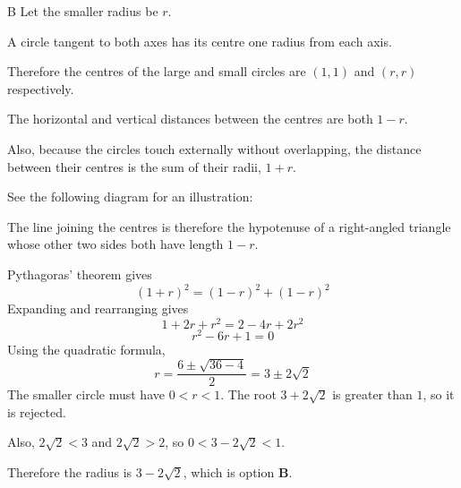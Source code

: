 \documentclass[11pt,a4paper]{article}
\begin{document}
\begin{enumerate}[label=\textbf{\arabic*.},leftmargin=*,itemsep=0pt,start=9]
\begin{djsSolution}{B}
Let the smaller radius be $r$. 

A circle tangent to both axes has its centre one radius from each axis. 

Therefore the centres of the large and small circles are $(1,1)$ and $(r,r)$ respectively.

The horizontal and vertical distances between the centres are both $1-r$. 

Also, because the circles touch externally without overlapping, the distance between their centres is the sum of their radii, $1+r$.

See the following diagram for an illustration:

\begin{djsSolutionFigure}
\end{djsSolutionFigure}

The line joining the centres is therefore the hypotenuse of a right-angled triangle whose other two sides both have length $1-r$. 

Pythagoras' theorem gives
\[
(1+r)^2=(1-r)^2+(1-r)^2
\]
Expanding and rearranging gives
\[
1+2r+r^2=2-4r+2r^2
\]
\[
r^2-6r+1=0
\]
Using the quadratic formula,
\[
r=\frac{6\pm\sqrt{36-4}}{2}=3\pm2\sqrt{2}
\]
The smaller circle must have $0<r<1$. The root $3+2\sqrt{2}$ is greater than $1$, so it is rejected. 

Also, $2\sqrt{2}<3$ and $2\sqrt{2}>2$, so $0<3-2\sqrt{2}<1$.

Therefore the radius is $3-2\sqrt{2}$, which is option \textbf{B}.
\end{djsSolution}
\end{enumerate}
\end{document}
